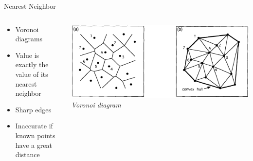 \begin{frame}{Nearest Neighbor}
	\begin{columns}[c] %
		\begin{column}{.52\textwidth}
			\begin{itemize}
				\item Voronoi diagrams
				\item Value is exactly the value of its nearest neighbor
				\item Sharp edges
				\item Inaccurate if known points have a great distance
			\end{itemize}
		\end{column}%
		\hfill%
		\begin{column}{.48\textwidth}
			\includegraphics[trim=0 0 294 0,clip,width=\linewidth]{../writeup/images/voronoi_delauny.png}\\
			\textit{\footnotesize Voronoi diagram \cite{sambridge_geophysical_1995}}
		\end{column}%
	\end{columns}
\end{frame}
